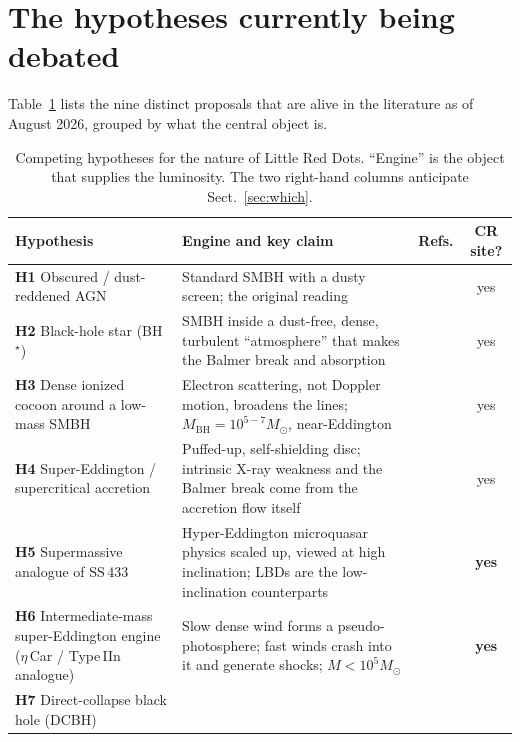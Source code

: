 \documentclass[11pt,a4paper]{article}
\begin{document}
\section{The hypotheses currently being debated}
\label{sec:hyp}
Table~\ref{tab:hyp} lists the nine distinct proposals that are alive in the
literature as of August 2026, grouped by what the central object is.

\begin{table}[t]\centering\small
\caption{Competing hypotheses for the nature of Little Red Dots. ``Engine'' is
the object that supplies the luminosity. The two right-hand columns anticipate
Sect.~\ref{sec:which}.}
\label{tab:hyp}
\begin{tabular}{@{}p{}p{}cc@{}}
\toprule
Hypothesis & Engine and key claim & Refs. & CR site? \\
\midrule
\textbf{H1} Obscured / dust-reddened AGN &
Standard SMBH with a dusty screen; the original reading &
\citealt{Matthee2024,Labbe2025,Kocevski2025} & yes \\
\addlinespace
\textbf{H2} Black-hole star (BH$^\star$) &
SMBH inside a dust-free, dense, turbulent ``atmosphere'' that makes the Balmer
break and absorption &
\citealt{Naidu2025} & yes \\
\addlinespace
\textbf{H3} Dense ionized cocoon around a low-mass SMBH &
Electron scattering, not Doppler motion, broadens the lines;
$M_{\mathrm{BH}}=10^{5-7}M_\odot$, near-Eddington &
\citealt{Rusakov2026,Barrufet2026} & yes \\
\addlinespace
\textbf{H4} Super-Eddington / supercritical accretion &
Puffed-up, self-shielding disc; intrinsic X-ray weakness and the Balmer break
come from the accretion flow itself &
\citealt{Liu2025,LiuJR2026} & yes \\
\addlinespace
\textbf{H5} Supermassive analogue of SS\,433 &
Hyper-Eddington microquasar physics scaled up, viewed at high inclination;
LBDs are the low-inclination counterparts &
\citealt{Zhou2026} & \textbf{yes} \\
\addlinespace
\textbf{H6} Intermediate-mass super-Eddington engine
($\eta$\,Car / Type\,IIn analogue) &
Slow dense wind forms a pseudo-photosphere; fast winds crash into it and
generate shocks; $M<10^{5}M_\odot$ &
\citealt{Naidu2026} & \textbf{yes} \\
\addlinespace
\textbf{H7} Direct-collapse black hole (DCBH) &

\end{tabular}
\end{table}
\end{document}
